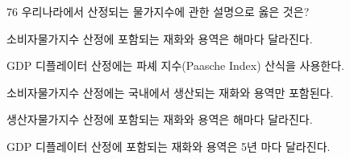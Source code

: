 \begin{question}{76}
우리나라에서 산정되는 물가지수에 관한 설명으로 옳은 것은?
\begin{choices}
  \item 소비자물가지수 산정에 포함되는 재화와 용역은 해마다 달라진다.
  \item GDP 디플레이터 산정에는 파셰 지수(Paasche Index) 산식을 사용한다.
  \item 소비자물가지수 산정에는 국내에서 생산되는 재화와 용역만 포함된다.
  \item 생산자물가지수 산정에 포함되는 재화와 용역은 해마다 달라진다.
  \item GDP 디플레이터 산정에 포함되는 재화와 용역은 5년 마다 달라진다.
\end{choices}
\end{question}
